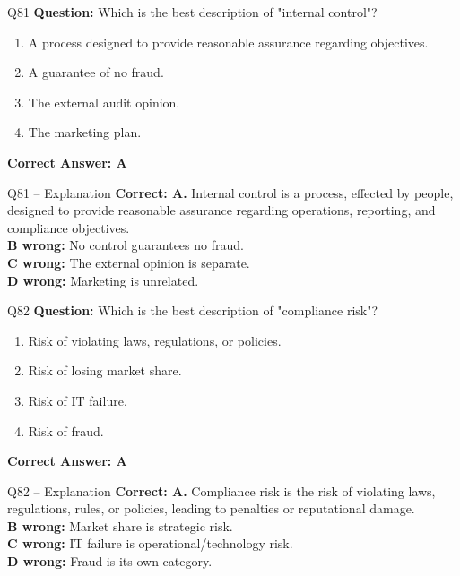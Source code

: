 \documentclass[aspectratio=169,10pt]{beamer}
\begin{document}
	\begin{frame}[t]{Q81}
		\small
		\textbf{Question:} Which is the best description of "internal control"?
		\begin{enumerate}[label=\Alph*.,itemsep=1pt,topsep=2pt]
			\item A process designed to provide reasonable assurance regarding objectives.
			\item A guarantee of no fraud.
			\item The external audit opinion.
			\item The marketing plan.
		\end{enumerate}
		\vspace{4pt}
		\textbf{Correct Answer: A}
	\end{frame}
	
	\begin{frame}[t]{Q81 -- Explanation}
		\small
		\textbf{Correct: A.} Internal control is a process, effected by people, designed to provide reasonable assurance regarding operations, reporting, and compliance objectives. \\[4pt]
		\textbf{B wrong:} No control guarantees no fraud. \\[2pt]
		\textbf{C wrong:} The external opinion is separate. \\[2pt]
		\textbf{D wrong:} Marketing is unrelated.
	\end{frame}
	
	\begin{frame}[t]{Q82}
		\small
		\textbf{Question:} Which is the best description of "compliance risk"?
		\begin{enumerate}[label=\Alph*.,itemsep=1pt,topsep=2pt]
			\item Risk of violating laws, regulations, or policies.
			\item Risk of losing market share.
			\item Risk of IT failure.
			\item Risk of fraud.
		\end{enumerate}
		\vspace{4pt}
		\textbf{Correct Answer: A}
	\end{frame}
	
	\begin{frame}[t]{Q82 -- Explanation}
		\small
		\textbf{Correct: A.} Compliance risk is the risk of violating laws, regulations, rules, or policies, leading to penalties or reputational damage. \\[4pt]
		\textbf{B wrong:} Market share is strategic risk. \\[2pt]
		\textbf{C wrong:} IT failure is operational/technology risk. \\[2pt]
		\textbf{D wrong:} Fraud is its own category.
	\end{frame}
	
\end{document}
